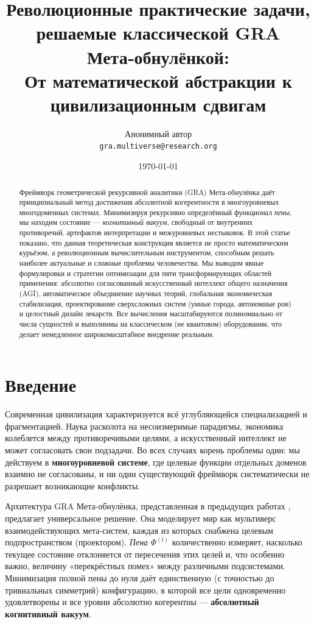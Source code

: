 \documentclass[11pt,a4paper]{article}
\title{\bfseries Революционные практические задачи, решаемые классической GRA Мета‑обнулёнкой:\\[4pt]
От математической абстракции к цивилизационным сдвигам}
\author{Анонимный автор\\
\texttt{gra.multiverse@research.org}}
\date{\today}
\theoremstyle{definition}
\newcommand{\Foam}{\Phi}
\begin{document}
\maketitle

\begin{abstract}
Фреймворк геометрической рекурсивной аналитики (GRA) Мета‑обнулёнка даёт принципиальный метод достижения абсолютной когерентности в многоуровневых многодоменных системах. Минимизируя рекурсивно определённый функционал \emph{пены}, мы находим состояние — \emph{когнитивный вакуум}, свободный от внутренних противоречий, артефактов интерпретации и межуровневых нестыковок.
В этой статье показано, что данная теоретическая конструкция является не просто математическим курьёзом, а революционным вычислительным инструментом, способным решать наиболее актуальные и сложные проблемы человечества.
Мы выводим явные формулировки и стратегии оптимизации для пяти трансформирующих областей применения: абсолютно согласованный искусственный интеллект общего назначения (AGI), автоматическое объединение научных теорий, глобальная экономическая стабилизация, проектирование сверхсложных систем (умные города, автономные рои) и целостный дизайн лекарств.
Все вычисления масштабируются полиномиально от числа сущностей и выполнимы на классическом (не квантовом) оборудовании, что делает немедленное широкомасштабное внедрение реальным.
\end{abstract}

\section{Введение}

Современная цивилизация характеризуется всё углубляющейся специализацией и фрагментацией. Наука расколота на несоизмеримые парадигмы, экономика колеблется между противоречивыми целями, а искусственный интеллект не может согласовать свои подзадачи. Во всех случаях корень проблемы один: мы действуем в \textbf{многоуровневой системе}, где целевые функции отдельных доменов взаимно не согласованы, и ни один существующий фреймворк систематически не разрешает возникающие конфликты.

Архитектура GRA Мета‑обнулёнка, представленная в предыдущих работах \cite{gra-orig}, предлагает универсальное решение. Она моделирует мир как мультиверс взаимодействующих мета‑систем, каждая из которых снабжена целевым подпространством (проектором). \emph{Пена} $\Foam^{(l)}$ количественно измеряет, насколько текущее состояние отклоняется от пересечения этих целей и, что особенно важно, величину «перекрёстных помех» между различными подсистемами. Минимизация полной пены до нуля даёт единственную (с точностью до тривиальных симметрий) конфигурацию, в которой все цели одновременно удовлетворены и все уровни абсолютно когерентны — \textbf{абсолютный когнитивный вакуум}.
\end{document}
